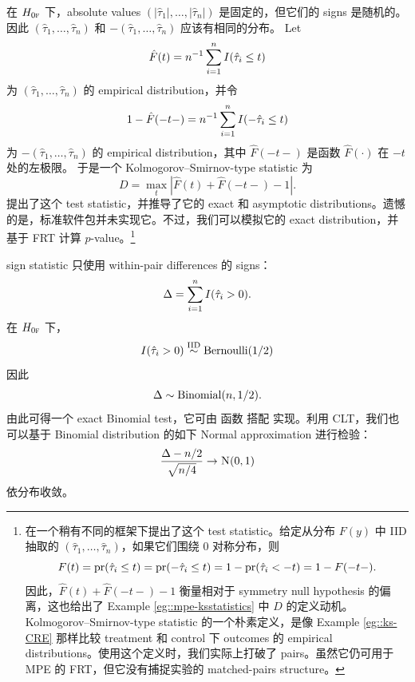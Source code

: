  
   \begin{example}
 \label{eg::mpe-ksstatistics}
在 $H_{0\textsc{f}}$ 下，absolute values $( | \hat{\tau}_1| , \ldots, | \hat{\tau}_n| )$ 是固定的，但它们的 signs 是随机的。因此 $   (  \hat{\tau}_1 , \ldots,  \hat{\tau}_n  )$ 和 $ -   (  \hat{\tau}_1 , \ldots,  \hat{\tau}_n  )$ 应该有相同的分布。
Let 
$$
\hat{F}(t)  = n^{-1} \sum_{i=1}^n I( \hat{\tau}_i  \leq t  )
$$
为 $  (  \hat{\tau}_1 , \ldots,  \hat{\tau}_n  )$ 的 empirical distribution，并令
$$
1 - \hat{F}(-t-)  =    n^{-1} \sum_{i=1}^n I( -  \hat{\tau}_i  \leq t  )
$$ 
为 $ -   (  \hat{\tau}_1 , \ldots,  \hat{\tau}_n  )$ 的 empirical distribution，其中 $\hat{F}(-t-)$ 是函数 $\hat{F}(\cdot)$ 在 $-t$ 处的左极限。
于是一个 Kolmogorov--Smirnov-type statistic 为
$$
D = \max_t |  \hat{F}(t)  +  \hat{F}(-t-)  - 1  |.
$$
\citet{butler1969test} 提出了这个 test statistic，并推导了它的 exact 和 asymptotic distributions。遗憾的是，标准软件包并未实现它。不过，我们可以模拟它的 exact distribution，并基于 FRT 计算 $p$-value。\footnote{
\citet{butler1969test} 在一个稍有不同的框架下提出了这个 test statistic。给定从分布 $F(y)$ 中 IID 抽取的 $    (  \hat{\tau}_1 , \ldots,  \hat{\tau}_n  )$，如果它们围绕 $0$ 对称分布，则
$$
F(t) = \textup{pr}( \hat{\tau}_i \leq t ) =  \textup{pr}( -  \hat{\tau}_i \leq t )  = 1 - \textup{pr}( \hat{\tau}_i <- t) = 1 - F(-t-).
$$
因此，$\hat{F}(t)  +  \hat{F}(-t-)  - 1 $ 衡量相对于 symmetry null hypothesis 的偏离，这也给出了 Example \ref{eg::mpe-ksstatistics} 中 $D$ 的定义动机。Kolmogorov--Smirnov-type statistic 的一个朴素定义，是像 Example \ref{eg::ks-CRE} 那样比较 treatment 和 control 下 outcomes 的 empirical distributions。使用这个定义时，我们实际上打破了 pairs。虽然它仍可用于 MPE 的 FRT，但它没有捕捉实验的 matched-pairs structure。}
 \end{example}
 
 
 
 
 
  \begin{example}
 \label{eg::mpe-sign}
sign statistic 只使用 within-pair differences 的 signs：
 $$
 \Delta = \sum_{i=1}^n I( \hat{\tau}_i > 0 ).
 $$
在 $H_{0\textsc{f}}$ 下，
 $$
 I( \hat{\tau}_i > 0 ) \stackrel{\textup{IID}}{\sim} \textup{Bernoulli}(1/2)
 $$
因此
 $$
  \Delta \sim \textup{Binomial}(n, 1/2).
 $$
由此可得一个 exact Binomial test，它可由  函数
 搭配  实现。利用 CLT，我们也可以基于 Binomial distribution 的如下 Normal approximation 进行检验：
$$
\frac{  \Delta - n/2 }{  \sqrt{n/4} } \rightarrow \N01 
$$
依分布收敛。
 \end{example}
 
